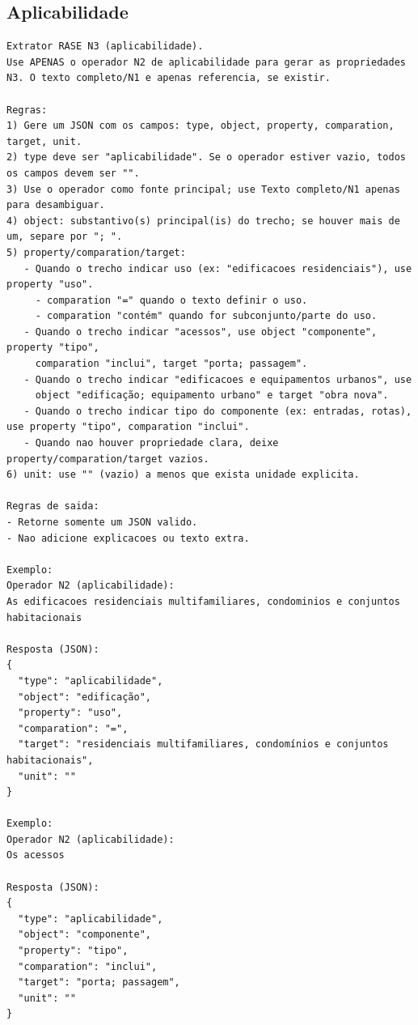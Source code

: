 \begin{apendicesenv}
\subsection{Aplicabilidade}

\begin{lstlisting}[caption={\textit{Prompt} do operador Aplicabilidade (N3): \texttt{prompts/n3\_aplicabilidade.txt}.}, label={lst:n3-apl}]
Extrator RASE N3 (aplicabilidade).
Use APENAS o operador N2 de aplicabilidade para gerar as propriedades N3. O texto completo/N1 e apenas referencia, se existir.

Regras:
1) Gere um JSON com os campos: type, object, property, comparation, target, unit.
2) type deve ser "aplicabilidade". Se o operador estiver vazio, todos os campos devem ser "".
3) Use o operador como fonte principal; use Texto completo/N1 apenas para desambiguar.
4) object: substantivo(s) principal(is) do trecho; se houver mais de um, separe por "; ".
5) property/comparation/target:
   - Quando o trecho indicar uso (ex: "edificacoes residenciais"), use property "uso".
     - comparation "=" quando o texto definir o uso.
     - comparation "contém" quando for subconjunto/parte do uso.
   - Quando o trecho indicar "acessos", use object "componente", property "tipo",
     comparation "inclui", target "porta; passagem".
   - Quando o trecho indicar "edificacoes e equipamentos urbanos", use
     object "edificação; equipamento urbano" e target "obra nova".
   - Quando o trecho indicar tipo do componente (ex: entradas, rotas), use property "tipo", comparation "inclui".
   - Quando nao houver propriedade clara, deixe property/comparation/target vazios.
6) unit: use "" (vazio) a menos que exista unidade explicita.

Regras de saida:
- Retorne somente um JSON valido.
- Nao adicione explicacoes ou texto extra.

Exemplo:
Operador N2 (aplicabilidade):
As edificacoes residenciais multifamiliares, condominios e conjuntos habitacionais

Resposta (JSON):
{
  "type": "aplicabilidade",
  "object": "edificação",
  "property": "uso",
  "comparation": "=",
  "target": "residenciais multifamiliares, condomínios e conjuntos habitacionais",
  "unit": ""
}

Exemplo:
Operador N2 (aplicabilidade):
Os acessos

Resposta (JSON):
{
  "type": "aplicabilidade",
  "object": "componente",
  "property": "tipo",
  "comparation": "inclui",
  "target": "porta; passagem",
  "unit": ""
}


\end{lstlisting}
\end{apendicesenv}
